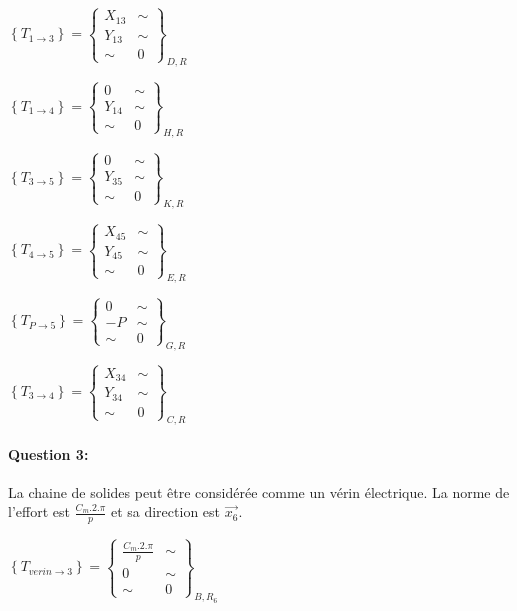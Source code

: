 $\left\{T_{1\rightarrow 3}\right\}=\left\{
\begin{array}{cc}
X_{13} & \sim \\
Y_{13} & \sim \\
\sim & 0
\end{array}
\right\}_{D,R}$

$\left\{T_{1\rightarrow 4}\right\}=\left\{
\begin{array}{cc}
0 & \sim \\
Y_{14} & \sim \\
\sim & 0
\end{array}
\right\}_{H,R}$

$\left\{T_{3\rightarrow 5}\right\}=\left\{
\begin{array}{cc}
0 & \sim \\
Y_{35} & \sim \\
\sim & 0
\end{array}
\right\}_{K,R}$

$\left\{T_{4\rightarrow 5}\right\}=\left\{
\begin{array}{cc}
X_{45} & \sim \\
Y_{45} & \sim \\
\sim & 0
\end{array}
\right\}_{E,R}$

$\left\{T_{P\rightarrow 5}\right\}=\left\{
\begin{array}{cc}
0 & \sim \\
-P & \sim \\
\sim & 0
\end{array}
\right\}_{G,R}$

$\left\{T_{3\rightarrow 4}\right\}=\left\{
\begin{array}{cc}
X_{34} & \sim \\
Y_{34} & \sim \\
\sim & 0
\end{array}
\right\}_{C,R}$

\paragraph{Question 3:}

La chaine de solides peut être considérée comme un vérin électrique. La norme de l'effort est $\frac{C_m.2.\pi}{p}$ et sa direction est $\overrightarrow{x_6}$.

$\left\{T_{verin \rightarrow 3}\right\}=\left\{
\begin{array}{cc}
\frac{C_m.2.\pi}{p} & \sim \\
0 & \sim \\
\sim & 0
\end{array}
\right\}_{B,R_6}$


